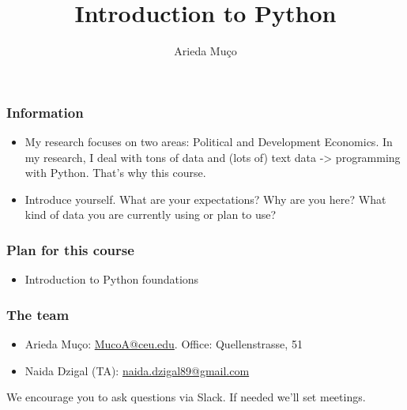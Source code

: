 \documentclass[compress, aspectratio=54]{beamer}
\title[Introduction]{Introduction to Python}
\author[Arieda Mu\c co]{Arieda Mu\c co}
\institute[CEU]{Central European University}
\date{}
\begin{document}
\captionsetup[subfigure]{labelformat=empty}

\frame{\titlepage}



\begin{frame}
\frametitle{Information}
\begin{itemize}
\item My research focuses on two areas: Political and Development Economics. In my research, I deal with tons of data and (lots of) text data -> programming with Python. That's why this course.
\item Introduce yourself. What are your expectations? Why are you here? What kind of data you are currently using or plan to use? 
\end{itemize}
\end{frame}

\begin{frame}
\frametitle{Plan for this course}
\begin{itemize}
\item Introduction to Python foundations
\end{itemize}
\end{frame}

\begin{frame}
\frametitle{The team }
\begin{itemize}
\item Arieda Mu\c co: \href{mailto:MucoA@ceu.edu}{MucoA@ceu.edu}. Office: Quellenstrasse,  51\\
\item Naida Dzigal (TA): \href{mailto:naida.dzigal89@gmail.com}{naida.dzigal89@gmail.com}\\
\begin{figure}%
   
        \qquad
\end{figure}
\end{itemize}
We encourage you to ask questions via Slack. If needed we'll set meetings.

\end{frame}
\end{document}
